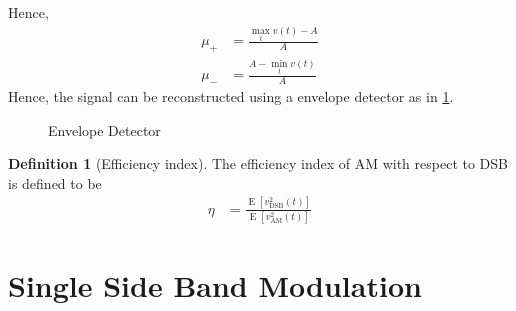 \documentclass[titlepage, fleqn, a4paper, 12pt, twoside]{article}
\theoremstyle{definition}
\newtheorem{definition}{Definition}
\theoremstyle{theorem}
\renewcommand{\tilde}{\widetilde}
\DeclareMathOperator{\expct}{\mathrm{E}}
\DeclareMathOperator{\DSB}{\mathrm{DSB}}
\DeclareMathOperator{\AM}{\mathrm{AM}}
\begin{document}
Hence,
\begin{align*}
	\mu_+ &= \frac{\max_{t} v(t) - A}{A}\\
	\mu_- &= \frac{A - \min_{t} v(t)}{A}
\end{align*}
Hence, the signal can be reconstructed using a envelope detector as in \cref{fig:envelope_detector}.

\begin{figure}[H]
	\centering
	\caption{Envelope Detector}
	\label{fig:envelope_detector}
\end{figure}

\begin{definition}[Efficiency index]
	The efficiency index of AM with respect to DSB is defined to be
	\begin{align*}
		\eta &= \frac{\expct\left[ v_{\DSB}^2(t) \right]}{\expct\left[ v_{\AM}^2(t) \right]}
	\end{align*}
\end{definition}

\section{Single Side Band Modulation}
\end{document}
